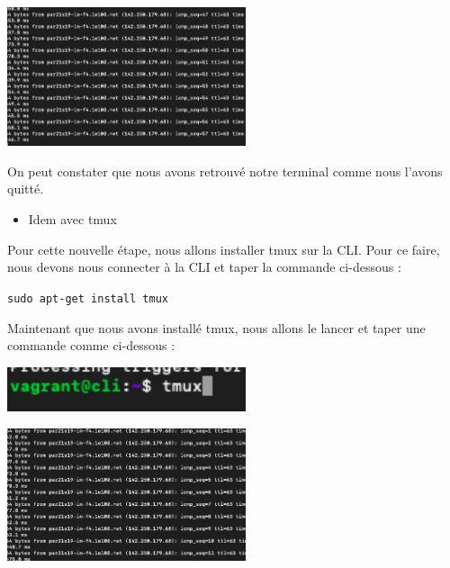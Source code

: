 \documentclass[12pt]{article}
\begin{document}
\vspace{0.3cm}

\begin{center}
  \includegraphics[width=7cm]{Images-Client-SSH/Image-TD-SSH-9/screen-return.png}
\end{center}

\vspace{0.3cm}

On peut constater que nous avons retrouvé notre terminal comme nous l'avons quitté.

\vspace{0.3cm}

\begin{itemize}
  \item Idem avec tmux
\end{itemize}

\vspace{0.3cm}

Pour cette nouvelle étape, nous allons installer tmux sur la CLI. Pour ce faire, nous devons nous connecter à la CLI et taper la commande ci-dessous :

\texttt{sudo apt-get install tmux}

\vspace{0.3cm}

Maintenant que nous avons installé tmux, nous allons le lancer et taper une commande comme ci-dessous :

\vspace{0.3cm}

\begin{center}
  \includegraphics[width=7cm]{Images-Client-SSH/Image-TD-SSH-9/tmux.png}
\end{center}

\vspace{0.3cm}

\begin{center}
  \includegraphics[width=7cm]{Images-Client-SSH/Image-TD-SSH-9/ping-tmux.png}
\end{center}
\end{document}
